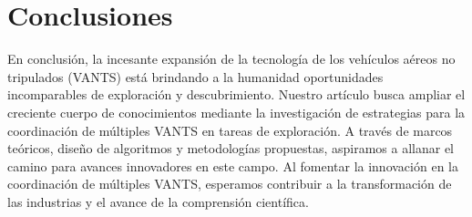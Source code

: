 \documentclass[sigconf]{acmart}
\begin{document}










\section{Conclusiones}

En conclusión, la incesante expansión de la tecnología de los vehículos aéreos no tripulados (VANTS) está brindando a la humanidad oportunidades incomparables de exploración y descubrimiento. Nuestro artículo busca ampliar el creciente cuerpo de conocimientos mediante la investigación de estrategias para la coordinación de múltiples VANTS en tareas de exploración. A través de marcos teóricos, diseño de algoritmos y metodologías propuestas, aspiramos a allanar el camino para avances innovadores en este campo. Al fomentar la innovación en la coordinación de múltiples VANTS, esperamos contribuir a la transformación de las industrias y el avance de la comprensión científica.\\
\end{document}
